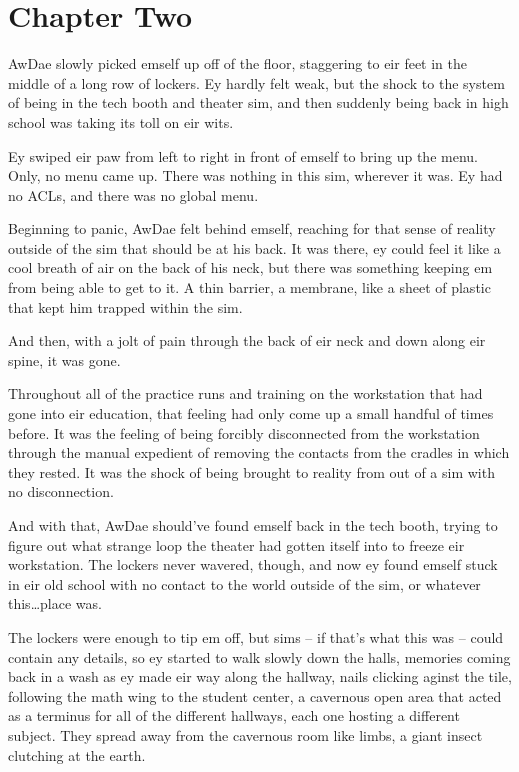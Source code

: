 \chapter*{Chapter Two}

AwDae slowly picked emself up off of the floor, staggering to eir feet in the middle of a long row of lockers. Ey hardly felt weak, but the shock to the system of being in the tech booth and theater sim, and then suddenly being back in high school was taking its toll on eir wits.

Ey swiped eir paw from left to right in front of emself to bring up the menu. Only, no menu came up. There was nothing in this sim, wherever it was. Ey had no ACLs, and there was no global menu.

Beginning to panic, AwDae felt behind emself, reaching for that sense of reality outside of the sim that should be at his back. It was there, ey could feel it like a cool breath of air on the back of his neck, but there was something keeping em from being able to get to it. A thin barrier, a membrane, like a sheet of plastic that kept him trapped within the sim.

And then, with a jolt of pain through the back of eir neck and down along eir spine, it was gone.

Throughout all of the practice runs and training on the workstation that had gone into eir education, that feeling had only come up a small handful of times before. It was the feeling of being forcibly disconnected from the workstation through the manual expedient of removing the contacts from the cradles in which they rested. It was the shock of being brought to reality from out of a sim with no disconnection.

And with that, AwDae should've found emself back in the tech booth, trying to figure out what strange loop the theater had gotten itself into to freeze eir workstation. The lockers never wavered, though, and now ey found emself stuck in eir old school with no contact to the world outside of the sim, or whatever this\ldots{}place was.

The lockers were enough to tip em off, but sims -- if that's what this was -- could contain any details, so ey started to walk slowly down the halls, memories coming back in a wash as ey made eir way along the hallway, nails clicking aginst the tile, following the math wing to the student center, a cavernous open area that acted as a terminus for all of the different hallways, each one hosting a different subject. They spread away from the cavernous room like limbs, a giant insect clutching at the earth.

